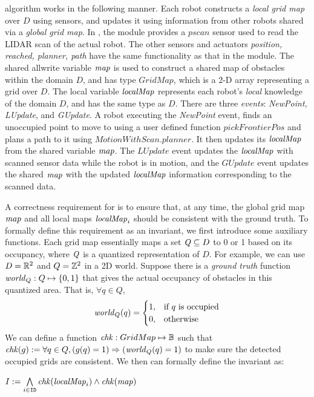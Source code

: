 \DMap algorithm works in the following manner.
Each robot constructs a \emph{local grid map} over $D$ using sensors,
and updates it using information from other robots shared via a \emph{global grid map}.
In , the \MotionWithScan module provides a $\mathit{pscan}$ sensor used to read the LIDAR scan of the actual robot.
The other sensors and actuators {\it position, reached, planner, path} have the same functionality as that in the \Motion module.
The shared allwrite variable $\mathit{map}$ is used to construct a shared map of obstacles within the domain $D$,
and has type $\mathit{GridMap}$, which is a 2-D array representing a grid over $D$.
The local variable $\mathit{localMap}$ represents each robot's \emph{local} knowledge of the domain $D$, and has the same type as $D$.
There are three \emph{events}: \emph{NewPoint, LUpdate}, and \emph{GUpdate}.
A robot executing the \emph{NewPoint} event, finds an unoccupied point to move to using a user defined function $\mathit{pickFrontierPos}$
and plans a path to it using $\mathit{MotionWithScan.planner}$.
It then updates its $\mathit{localMap}$ from the shared variable $\mathit{map}$.
The $\mathit{LUpdate}$ event updates the $\mathit{localMap}$ with scanned sensor data while the robot is in motion,
and the $\mathit{GUpdate}$ event updates the shared $\mathit{map}$ with the updated $\mathit{localMap}$ information corresponding to the scanned data.

A correctness requirement for \DMap is to ensure that, at any time,
the global grid map $\mathit{map}$ and all local maps $\mathit{localMap}_i$ should be consistent with the ground truth.
To formally define this requirement as an invariant, we first introduce some auxiliary functions.
Each grid map essentially maps a set $\mathit{Q} \subseteq D$ to 0 or 1 based on its occupancy,
where $\mathit{Q}$ is a quantized representation of $D$.
For example, we can use $D=\reals^2$ and $Q=\integers^2$ in a 2D world.
Suppose there is a \emph{ground truth} function $\mathit{world}_Q : Q \mapsto \{0, 1\}$ that gives the actual occupancy of obstacles in this quantized area.
That is, $\forall q \in Q$,
\[
    \mathit{world}_Q(q) =
    \begin{cases}
        1, & \text{if $q$ is occupied}\\
        0, & \text{otherwise}
    \end{cases}
\]
We can define a function $\mathit{chk}: GridMap \mapsto \mathbb{B}$ such that
$\mathit{chk}(g) := \forall q \in Q, (g(q) = 1) \Rightarrow (\mathit{world}_Q(q) = 1)$ to make sure the detected occupied grids are consistent.
We then can formally define the invariant as:
\begin{invariant}
    \label{inv:mapping}
    $I := \bigwedge\limits_{i \in \texttt{ID}} \mathit{chk}(\mathit{localMap}_i) \land \mathit{chk}(\mathit{map})$
\end{invariant}

